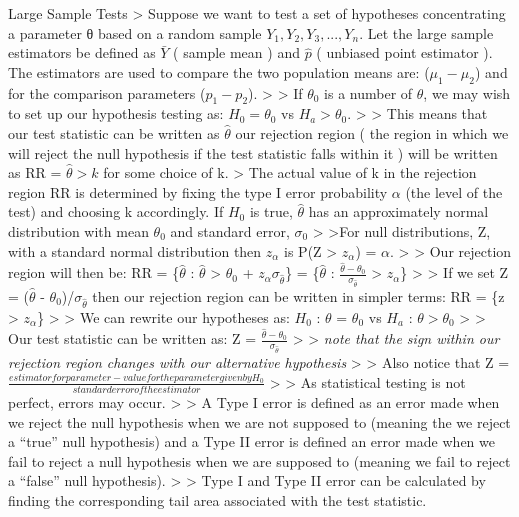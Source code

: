 \documentclass[11pt]{article}
\begin{document}
    Large Sample Tests \textgreater{} Suppose we want to test a set of
hypotheses concentrating a parameter θ based on a random sample
\(Y_1, Y_2, Y_3, ..., Y_n\). Let the large sample estimators be defined
as \(\bar{Y}\) ( sample mean ) and \(\hat{p}\) ( unbiased point
estimator ). The estimators are used to compare the two population means
are: (\(\mu_1 - \mu_2\)) and for the comparison parameters
(\(p_1 - p_2\)). \textgreater{} \textgreater{} If \(\theta_0\) is a
number of \(\theta\), we may wish to set up our hypothesis testing as:
\(H_0 = \theta_0\) vs \(H_a > \theta_0\). \textgreater{} \textgreater{}
This means that our test statistic can be written as \(\hat{\theta}\)
our rejection region ( the region in which we will reject the null
hypothesis if the test statistic falls within it ) will be written as RR
= \(\hat{\theta} > k\) for some choice of k. \textgreater{} The actual
value of k in the rejection region RR is determined by fixing the type I
error probability \(\alpha\) (the level of the test) and choosing k
accordingly. If \(H_0\) is true, \(\hat{\theta}\) has an approximately
normal distribution with mean \(\theta_0\) and standard error,
\(\sigma_0\) \textgreater{} \textgreater{}For null distributions, Z,
with a standard normal distribution then \(z_\alpha\) is P(Z
\textgreater{} \(z_\alpha\)) = \(\alpha\). \textgreater{} \textgreater{}
Our rejection region will then be: RR = \{\(\hat{\theta}\) :
\(\hat{\theta}\) \textgreater{} \(\theta_0\) +
\(z_\alpha\sigma_\hat{\theta}\)\} = \{\(\hat{\theta}\) :
\(\frac{\hat{\theta} - \theta_0}{\sigma_\hat{\theta}}\) \textgreater{}
\(z_\alpha\)\} \textgreater{} \textgreater{} If we set Z =
(\(\hat{\theta}\) - \(\theta_0\))/\(\sigma_\hat{\theta}\) then our
rejection region can be written in simpler terms: RR = \{z
\textgreater{} \(z_\alpha\)\} \textgreater{} \textgreater{} We can
rewrite our hypotheses as: \(H_0\) : \(\theta\) = \(\theta_0\) vs
\(H_a\) : \(\theta > \theta_0\) \textgreater{} \textgreater{} Our test
statistic can be written as: Z =
\(\frac{\hat{\theta} - \theta_0}{\sigma_\hat{\theta}}\) \textgreater{}
\textgreater{} \emph{note that the sign within our rejection region
changes with our alternative hypothesis} \textgreater{} \textgreater{}
Also notice that Z =
\(\frac{estimator for parameter - value for the parameter given by H_0}{standard error of the estimator}\)
\textgreater{} \textgreater{} As statistical testing is not perfect,
errors may occur. \textgreater{} \textgreater{} A Type I error is
defined as an error made when we reject the null hypothesis when we are
not supposed to (meaning the we reject a ``true'' null hypothesis) and a
Type II error is defined an error made when we fail to reject a null
hypothesis when we are supposed to (meaning we fail to reject a
``false'' null hypothesis). \textgreater{} \textgreater{} Type I and
Type II error can be calculated by finding the corresponding tail area
associated with the test statistic.
\end{document}
